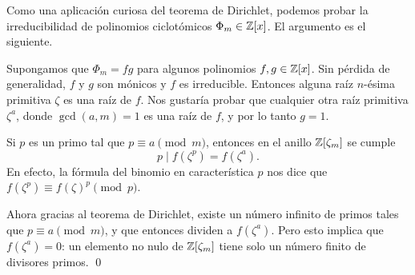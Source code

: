 Como una aplicación curiosa del teorema de Dirichlet, podemos probar
la irreducibilidad de polinomios ciclotómicos $\Phi_m \in \mathbb{Z} [x]$. El argumento
es el siguiente.

Supongamos que $\Phi_m = fg$ para algunos polinomios $f,g \in \mathbb{Z}[x]$.
Sin pérdida de generalidad, $f$ y $g$ son mónicos y $f$ es irreducible. Entonces
alguna raíz $n$-ésima primitiva $\zeta$ es una raíz de $f$. Nos gustaría
probar que cualquier otra raíz primitiva $\zeta^a$, donde $\gcd (a,m) = 1$ es
una raíz de $f$, y por lo tanto $g = 1$.

Si $p$ es un primo tal que $p \equiv a \pmod{m}$, entonces en el anillo
$\mathbb{Z} [\zeta_m]$ se cumple
$$p \mid f (\zeta^p) = f (\zeta^a).$$
En efecto, la fórmula del binomio en característica $p$ nos dice que
$f (\zeta^p) \equiv f (\zeta)^p \pmod{p}$.

Ahora gracias al teorema de Dirichlet, existe un número infinito de primos tales
que $p \equiv a \pmod{m}$, y que entonces dividen a $f (\zeta^a)$. Pero
esto implica que $f (\zeta^a) = 0$: un elemento no nulo de $\mathbb{Z} [\zeta_m]$ tiene
solo un número finito de divisores primos. \qed
